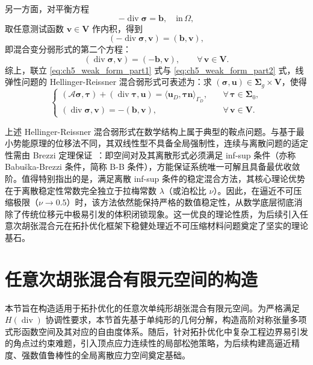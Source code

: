 另一方面，对平衡方程
\[
-\operatorname{div}\boldsymbol{\sigma} = \boldsymbol{b},\quad\text{in}\,\Omega,
\]
取任意测试函数 $\boldsymbol{v}\in\boldsymbol{V}$ 作内积，得到
\[
(-\operatorname{div}\boldsymbol{\sigma},\boldsymbol{v}) = (\boldsymbol{b},\boldsymbol{v}),
\]
即混合变分弱形式的第二个方程：
\begin{equation}
	(\operatorname{div}\boldsymbol{\sigma},\boldsymbol{v}) =(-\boldsymbol{b},\boldsymbol{v}), \qquad\forall\,\boldsymbol{v}\in\boldsymbol{V}.
	\label{eq:ch5_weak_form_part2}
\end{equation}
综上，联立 \eqref{eq:ch5_weak_form_part1} 式与 \eqref{eq:ch5_weak_form_part2} 式，线弹性问题的 Hellinger-Reissner 混合弱形式可表述为：求 $(\boldsymbol{\sigma},\boldsymbol{u})\in\boldsymbol{\Sigma}_g\times\boldsymbol{V}$，使得
\begin{equation} 
	\begin{cases} 
		(\mathcal{A}\boldsymbol{\sigma},\boldsymbol{\tau}) + (\operatorname{div}\boldsymbol{\tau}, \boldsymbol{u}) =\langle\boldsymbol{u}_D,\boldsymbol{\tau}\boldsymbol{n}\rangle_{\Gamma_D}, &\quad \forall\,\boldsymbol{\tau}\in\boldsymbol{\Sigma}_0,\\[0.4em] 
		(\operatorname{div}\boldsymbol{\sigma},\boldsymbol{v}) = -(\boldsymbol{b},\boldsymbol{v}), &\quad \forall\,\boldsymbol{v}\in\boldsymbol{V}. 
	\end{cases}
	\label{eq:ch5_hr_weak_form}
\end{equation}

上述 Hellinger-Reissner 混合弱形式在数学结构上属于典型的鞍点问题。与基于最小势能原理的位移法不同，其双线性型不具备全局强制性，连续与离散问题的适定性需由 Brezzi 定理保证~\cite{brezziMixedHybridFinite1991}：即空间对及其离散形式必须满足 inf-sup 条件（亦称 Babuška-Brezzi 条件，简称 B-B 条件），方能保证系统唯一可解且具备最优收敛阶。值得特别指出的是，满足离散 inf-sup 条件的稳定混合方法，其核心理论优势在于离散稳定性常数完全独立于拉梅常数 $\lambda$（或泊松比 $\nu$）。因此，在逼近不可压缩极限（$\nu\to 0.5$）时，该方法依然能保持严格的数值稳定性，从数学底层彻底消除了传统位移元中极易引发的体积闭锁现象。这一优良的理论性质，为后续引入任意次胡张混合元在拓扑优化框架下稳健处理近不可压缩材料问题奠定了坚实的理论基石。


\section{任意次胡张混合有限元空间的构造}
\label{sec:hz_space_construction}

本节旨在构造适用于拓扑优化的任意次单纯形胡张混合有限元空间。为严格满足 $H(\operatorname{div})$ 协调性要求，本节首先基于单纯形的几何分解，构造高阶对称张量多项式形函数空间及其对应的自由度体系。随后，针对拓扑优化中复杂工程边界易引发的角点过约束难题，引入顶点应力连续性的局部松弛策略，为后续构建高逼近精度、强数值鲁棒性的全局离散应力空间奠定基础。


